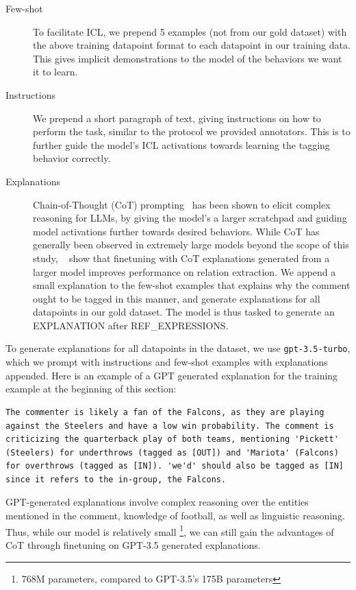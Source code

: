 \begin{description}
    \item[Few-shot] To facilitate ICL, we prepend 5 examples (not from our gold dataset) with the above training datapoint format to each datapoint in our training data. This gives implicit demonstrations to the model of the behaviors we want it to learn.
    \item[Instructions] We prepend a short paragraph of text, giving instructions on how to perform the task, similar to the protocol we provided annotators. This is to further guide the model's ICL activations towards learning the tagging behavior correctly.
    \item[Explanations] Chain-of-Thought (CoT) prompting~\citep{NEURIPS2022_9d560961} has been shown to elicit complex reasoning for LLMs, by giving the model's a larger scratchpad and guiding model activations further towards desired behaviors. While CoT has generally been observed in extremely large models beyond the scope of this study, ~\citet{Wadhwa2023RevisitingRE} show that finetuning with CoT explanations generated from a larger model improves performance on relation extraction. We append a small explanation to the few-shot examples that explains why the comment ought to be tagged in this manner, and generate explanations for all datapoints in our gold dataset. The model is thus tasked to generate an EXPLANATION after REF\_EXPRESSIONS.
\end{description}

To generate explanations for all datapoints in the dataset, we use \texttt{gpt-3.5-turbo}, which we prompt with instructions and few-shot examples with explanations appended. Here is an example of a GPT generated explanation for the training example at the beginning of this section:

\begin{verbatim}
The commenter is likely a fan of the Falcons, as they are playing 
against the Steelers and have a low win probability. The comment is 
criticizing the quarterback play of both teams, mentioning 'Pickett' 
(Steelers) for underthrows (tagged as [OUT]) and 'Mariota' (Falcons) 
for overthrows (tagged as [IN]). 'we'd' should also be tagged as [IN] 
since it refers to the in-group, the Falcons.
\end{verbatim}

GPT-generated explanations involve complex reasoning over the entities mentioned in the comment, knowledge of football, as well as linguistic reasoning. Thus, while our model is relatively small \footnote{768M parameters, compared to GPT-3.5's 175B parameters}, we can still gain the advantages of CoT through finetuning on GPT-3.5 generated explanations.

